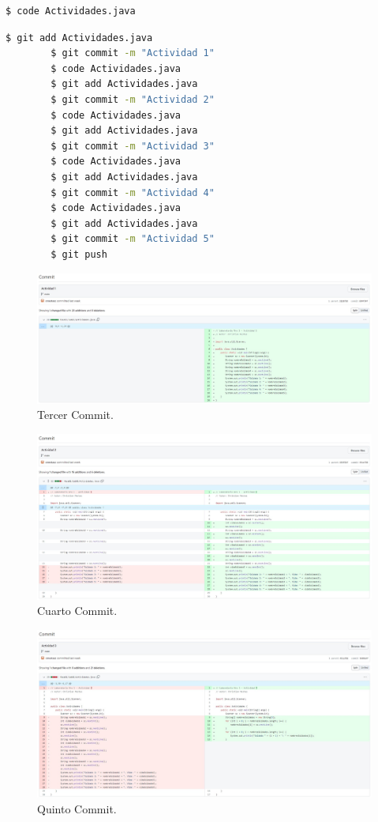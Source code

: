\documentclass{article}
\begin{document}
\begin{lstlisting}[language=bash,caption={Creando Actividades.java}]
		$ code Actividades.java
	\end{lstlisting}
\begin{lstlisting}[language=bash,caption={Tercer - Septimo Commit / Actividades.java}]
		$ git add Actividades.java
		$ git commit -m "Actividad 1"
		$ code Actividades.java
		$ git add Actividades.java
		$ git commit -m "Actividad 2"
		$ code Actividades.java
		$ git add Actividades.java
		$ git commit -m "Actividad 3"
		$ code Actividades.java
		$ git add Actividades.java
		$ git commit -m "Actividad 4"
		$ code Actividades.java
		$ git add Actividades.java
		$ git commit -m "Actividad 5"
		$ git push
	\end{lstlisting}
\begin{figure}[H]
	\centering
	\includegraphics[width=1\textwidth,keepaspectratio]{img/commit03.jpg}
	\caption{Tercer Commit.}
\end{figure}
\begin{figure}[H]
	\centering
	\includegraphics[width=1\textwidth,keepaspectratio]{img/commit04.jpg}
	\caption{Cuarto Commit.}
\end{figure}
\begin{figure}[H]
	\centering
	\includegraphics[width=1\textwidth,keepaspectratio]{img/commit05.jpg}
	\caption{Quinto Commit.}
\end{figure}
\end{document}
